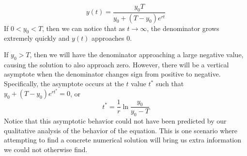 \begin{example}
    \[ y(t) = \frac{y_0T}{y_0 + (T-y_0)e^{rt}} \]
    If $0 < y_0 < T$, then we can notice that as $t\to\infty$, the denominator grows extremely quickly and $y(t)$ approaches $0$. \par
    If $y_0 > T$, then we will have the denominator approaching a large negative value, causing the solution to also approach zero. However, there will be a vertical asymptote when the denominator changes sign from positive to negative. Specifically, the asymptote occurs at the $t$ value $t^*$ such that $y_0 + (T-y_0)e^{rt^*} = 0$, or
    \[ t^* = \frac{1}{r}\ln \frac{y_0}{y_0-T}\]
    Notice that this asymptotic behavior could not have been predicted by our qualitative analysis of the behavior of the equation. This is one scenario where attempting to find a concrete numerical solution will bring us extra information we could not otherwise find. 
\end{example}
